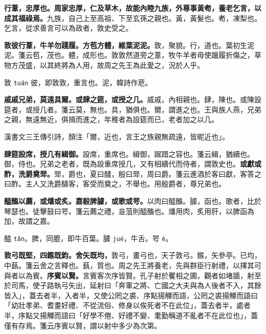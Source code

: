 
\textbf{行葦，忠厚也。周家忠厚，仁及草木，故能內睦九族，外尊事黃耇，養老乞言，以成其福祿焉。}{\footnotesize 九族，自己上至高祖、下至玄孫之親也。黃，黃髮也。耇，凍梨也。乞言，從求善言可以為政者，敦史受之。}

\textbf{敦彼行葦，牛羊勿踐履。方苞方體，維葉泥泥。}{\footnotesize 敦，聚貌。行，道也。葉初生泥泥。箋云苞，茂也。體，成形也。敦敦然道旁之葦，牧牛羊者毋使躐履折傷之，草物方茂盛，以其終將為人用，故周之先王為此愛之，況於人乎。}

\begin{quoting}敦 \texttt{tuán} 彼，即敦敦，重言也。泥，韓詩作苨。\end{quoting}

\textbf{戚戚兄弟，莫遠具爾。或肆之筵，或授之几。}{\footnotesize 戚戚，內相親也。肆，陳也。或陳設筵者，或授几者。箋云莫，無也。具，猶俱也。爾，謂進之也。王與族人燕，兄弟之親，無遠無近，俱揖而進之，年稚者為設筵而已，老者加之以几。}

\begin{quoting}漢書文三王傳引詩，顏注「爾，近也，言王之族親無疏遠，皆昵近也」。\end{quoting}

\textbf{肆筵設席，授几有緝御。}{\footnotesize 設席，重席也。緝御，踧踖之容也。箋云緝，猶續也。御，侍也。兄弟之老者，既為設重席授几，又有相續代而侍者，謂敦史也。}\textbf{或獻或酢，洗爵奠斝。}{\footnotesize 斝，爵也，夏曰醆，殷曰斝，周曰爵。箋云進酒於客曰獻，客答之曰酢。主人又洗爵醻客，客受而奠之，不舉也。用殷爵者，尊兄弟也。}

\textbf{醓醢以薦，或燔或炙。嘉殽脾臄，或歌或咢。}{\footnotesize 以肉曰醓醢。臄，函也。歌者，比於琴瑟也。徒擊鼓曰咢。箋云薦之禮，韭菹則醓醢也。燔用肉，炙用肝，以脾函為加，故謂之嘉。}

\begin{quoting}醓 \texttt{tǎn}。脾，同膍，即牛百葉。臄 \texttt{jué}，牛舌。咢 \texttt{è}。\end{quoting}

\textbf{敦弓既堅，四鍭既鈞。舍矢既均，}{\footnotesize 敦弓，畫弓也，天子敦弓。鍭，矢參亭。已均，中蓺。箋云舍之言釋也。蓺，質也。周之先王將養老，先與群臣行射禮，以擇其可與者以為賓。}\textbf{序賓以賢。}{\footnotesize 言賓客次序皆賢。孔子射於矍相之圃，觀者如堵牆，射至於司馬，使子路執弓矢出，延射曰「奔軍之將、亡國之大夫與為人後者不入，其餘皆入」，蓋去者半，入者半，又使公罔之裘、序點揚觶而語，公罔之裘揚觶而語曰「幼壯孝弟、耆耋好禮、不從流俗、修身以俟死者不在此位」，蓋去者半，處者半，序點又揚觶而語曰「好學不倦、好禮不變、耄勤稱道不亂者不在此位也」，蓋僅有存焉。箋云序賓以賢，謂以射中多少為次第。}

